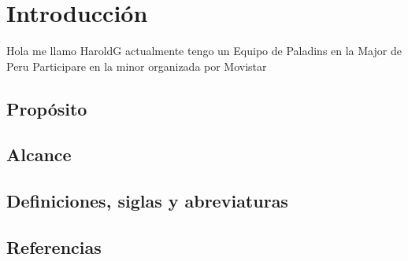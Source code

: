 \chapter{Introducción}
Hola me llamo HaroldG actualmente tengo un Equipo de Paladins en la Major de Peru
Participare en la minor organizada por Movistar 
\section{Propósito}

\section{Alcance}

\section{Definiciones, siglas y abreviaturas}

\section{Referencias}